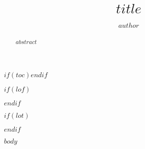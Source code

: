 \documentclass[a4paper, 12pt]{article}
\title{$title$}
\author{$author$}
\begin{document}
\maketitle

\begin{abstract}
	$abstract$
\end{abstract}


$if(toc)$\tableofcontents$endif$

$if(lof)$
\listoffigures
$endif$

$if(lot)$
\listoftables
$endif$


$body$
\end{document}
